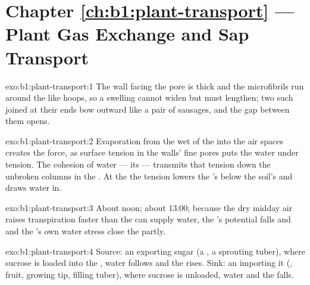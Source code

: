 \section*{Chapter \ref{ch:b1:plant-transport} --- Plant Gas Exchange and Sap Transport}

\begin{solution}{exo:b1:plant-transport:1}
The wall facing the pore is thick and the microfibrils run around the
 like hoops, so a swelling  cannot widen but must lengthen;
two such  joined at their ends bow outward like a pair of
sausages, and the gap between them opens.
\end{solution}

\begin{solution}{exo:b1:plant-transport:2}
Evaporation from the wet  of the  into the air spaces
creates the force, as surface tension in the walls' fine pores puts
the water under tension. The cohesion of water --- its 
--- transmits that tension down the unbroken columns in the .
At the  the tension lowers the 's  below the
soil's and draws water in.
\end{solution}

\begin{solution}{exo:b1:plant-transport:3}
About noon; about 13:00; because the dry midday air raises
transpiration faster than the  can supply water, the 's
potential falls and  and the 's own water stress
close the  partly.
\end{solution}

\begin{solution}{exo:b1:plant-transport:4}
Source: an  exporting sugar (a , a sprouting tuber), where
sucrose is loaded into the , water follows and the 
rises. Sink: an  importing it (, fruit, growing tip, filling
tuber), where sucrose is unloaded, water  and the  falls.
\end{solution}

